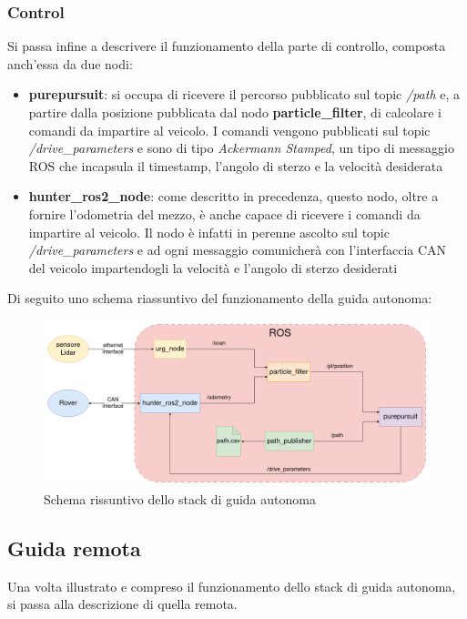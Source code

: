 \subsubsection{Control}
\noindent Si passa infine a descrivere il funzionamento della parte di controllo, composta anch'essa da due nodi:

\begin{itemize}
  \item \textbf{purepursuit}: si occupa di ricevere il percorso pubblicato sul topic \textit{/path} e, a partire dalla posizione pubblicata dal nodo \textbf{particle\_filter}, di calcolare i comandi da impartire al veicolo. I comandi vengono pubblicati sul topic \textit{/drive\_parameters} e sono di tipo \textit{Ackermann Stamped}, un tipo di messaggio ROS che incapsula il timestamp, l'angolo di sterzo e la velocità desiderata
  \item \textbf{hunter\_ros2\_node}: come descritto in precedenza, questo nodo, oltre a fornire l'odometria del mezzo, è anche capace di ricevere i comandi da impartire al veicolo. Il nodo è infatti in perenne ascolto sul topic \textit{/drive\_parameters} e ad ogni messaggio comunicherà con l'interfaccia CAN del veicolo impartendogli la velocità e l'angolo di sterzo desiderati
\end{itemize}

\noindent Di seguito uno schema riassuntivo del funzionamento della guida autonoma:
\begin{figure}[h]
  \centering
  \includegraphics[width=1\textwidth]{figures/schema_guida_autonoma.png}
  \caption{Schema rissuntivo dello stack di guida autonoma}
  \label{Schema rissuntivo dello stack di guida autonoma}
\end{figure}

\subsection{Guida remota}
Una volta illustrato e compreso il funzionamento dello stack di guida autonoma, si passa alla descrizione di quella remota.

